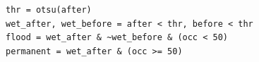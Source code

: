 \begin{lstlisting}[firstnumber=25]
thr = otsu(after)
wet_after, wet_before = after < thr, before < thr
flood = wet_after & ~wet_before & (occ < 50)
permanent = wet_after & (occ >= 50)
\end{lstlisting}
